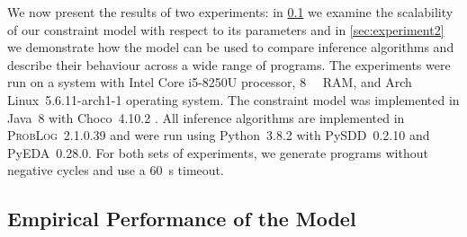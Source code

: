 \documentclass[runningheads]{llncs}
\begin{document}
We now present the results of two experiments: in \cref{sec:experiment1} we
examine the scalability of our constraint model with respect to its parameters
and in \cref{sec:experiment2} we demonstrate how the model can be used to
compare inference algorithms and describe their behaviour across a wide range of
programs. The experiments were run on a system with Intel Core i5-8250U
processor, \SI{8}{\giga\byte} RAM, and Arch Linux~5.6.11-arch1-1 operating
system. The constraint model was implemented in Java~8 with
Choco~4.10.2 \cite{choco}. All inference algorithms are implemented in
\textsc{ProbLog}~2.1.0.39 and were run using Python~3.8.2 with PySDD~0.2.10 and
PyEDA~0.28.0. For both sets of experiments, we generate programs without
negative cycles and use a \SI{60}{\second} timeout.

\subsection{Empirical Performance of the Model} \label{sec:experiment1}
\end{document}
